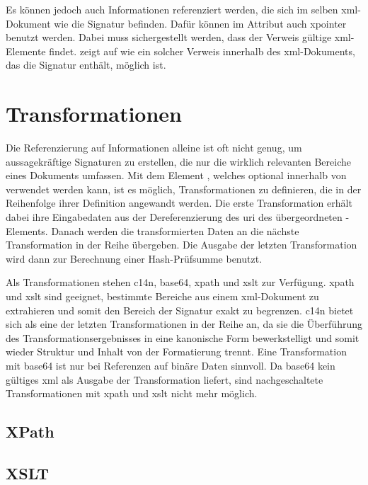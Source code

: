Es können jedoch auch Informationen referenziert werden, die sich im selben \gls{xml}-Dokument wie die Signatur befinden. Dafür können im Attribut
 auch \gls{xpointer} benutzt werden. Dabei muss sichergestellt werden, dass der Verweis gültige \gls{xml}-Elemente findet.
 zeigt auf  wie ein solcher Verweis innerhalb des \gls{xml}-Dokuments,
das die Signatur enthält, möglich ist.

\section{Transformationen}
\label{sec:XML-DSig:Transformationen}
Die Referenzierung auf Informationen alleine ist oft nicht genug, um aussagekräftige Signaturen zu erstellen, die nur die wirklich relevanten Bereiche eines
Dokuments umfassen. Mit dem Element , welches optional innerhalb von  verwendet werden kann, ist es möglich,
Transformationen zu definieren, die in der Reihenfolge ihrer Definition angewandt werden. Die erste Transformation erhält dabei ihre Eingabedaten aus der
Dereferenzierung des \gls{uri} des übergeordneten -Elements. Danach werden die transformierten Daten an die nächste Transformation in der
Reihe übergeben. Die Ausgabe der letzten Transformation wird dann zur Berechnung einer Hash-Prüfsumme benutzt.

Als Transformationen stehen \gls{c14n}, \gls{base64}, \gls{xpath} und \gls{xslt} zur Verfügung. \gls{xpath} und \gls{xslt} sind geeignet, bestimmte Bereiche aus
einem \gls{xml}-Dokument zu extrahieren und somit den Bereich der Signatur exakt zu begrenzen. \gls{c14n} bietet sich als eine der letzten
Transformationen in der Reihe an, da sie die Überführung des Transformationsergebnisses in eine kanonische Form bewerkstelligt und somit wieder Struktur und
Inhalt von der Formatierung trennt. Eine Transformation mit \gls{base64} ist nur bei Referenzen auf binäre Daten sinnvoll. Da \gls{base64} kein gültiges
\gls{xml} als Ausgabe der Transformation liefert, sind nachgeschaltete Transformationen mit \gls{xpath} und \gls{xslt} nicht mehr möglich.

\subsection{XPath}
\label{sec:XML-DSig:Transformationen:XPath}

\subsection{XSLT}
\label{sec:XML-DSig:Transformationen:XSLT}

